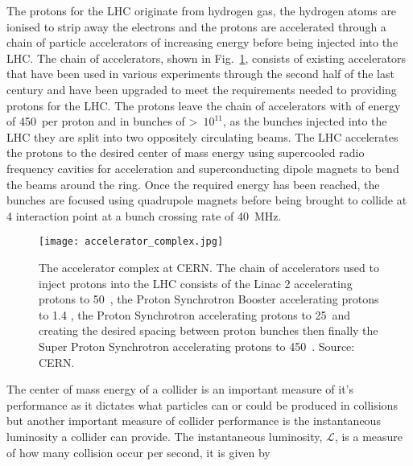 The protons for the LHC originate from hydrogen gas, %
the hydrogen atoms are ionised to strip away the electrons and the protons are accelerated through a chain of particle accelerators of increasing energy before being injected into the LHC. The chain of accelerators, shown in Fig.~\ref{fig:accelerator_chain}, consists of existing accelerators that have been used in various experiments through the second half of the last century and have been upgraded to meet the requirements needed to providing protons for the LHC. 
The protons leave the chain of accelerators with of energy of 450~\gev per proton and in bunches of >~$10^{11}$, as the bunches injected into the LHC they are split into two oppositely circulating beams.
The LHC accelerates the protons to the desired center of mass energy using supercooled radio frequency cavities for acceleration and superconducting dipole magnets to bend the beams around the ring. %
Once the required energy has been reached, the bunches are focused using quadrupole magnets before being brought to collide at 4 interaction point at a bunch crossing rate of 40~MHz. 


\begin{figure}[htbp!] 
  \centering    
  \texttt{[image: accelerator\_complex.jpg]}
  \caption{The accelerator complex at CERN. The chain of accelerators used to inject protons into the LHC consists of the Linac 2 accelerating protons to 50~\mev, the Proton Synchrotron Booster accelerating protons to 1.4 \gev, the Proton Synchrotron accelerating protons to 25~\gev and creating the desired spacing between proton bunches then finally the Super Proton Synchrotron accelerating protons to 450~\gev. Source: CERN.}
  \label{fig:accelerator_chain}
\end{figure}




The center of mass energy of a collider is an important measure of it's performance as it dictates what particles can or could be produced in collisions but another important measure of collider performance is the instantaneous luminosity a collider can provide. The instantaneous luminosity, $\mathcal{L}$, is a measure of how many collision occur per second, it is given by

